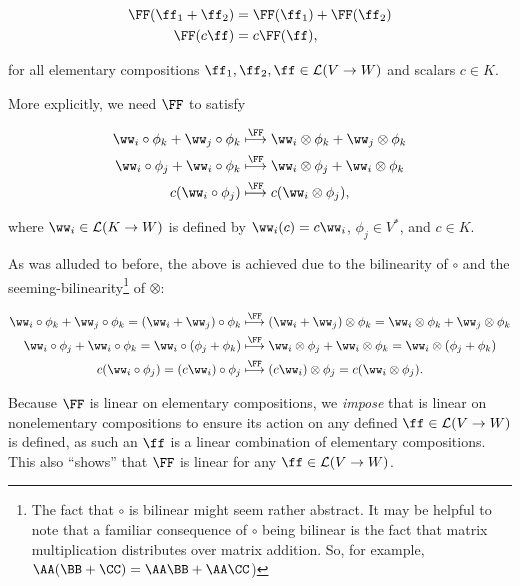 \begin{align*}
    \FF(\ff_1 + \ff_2) &= \FF(\ff_1) + \FF(\ff_2) \\
    \FF(c\ff) &= c\FF(\ff),
\end{align*}

for all elementary compositions $\ff_1, \ff_2, \ff \in \LLLL(V \rightarrow W)$ and scalars $c \in K$.

More explicitly, we need $\FF$ to satisfy

\begin{align*}
    \ww_i \circ \phi_k + \ww_j \circ \phi_k 
    &\overset{\FF}{\longmapsto}
    \ww_i \otimes \phi_k + \ww_j \otimes \phi_k
    \\
    \ww_i \circ \phi_j + \ww_i \circ \phi_k 
    &\overset{\FF}{\longmapsto}
    \ww_i \otimes \phi_j + \ww_i \otimes \phi_k
    \\
    c (\ww_i \circ \phi_j)
    &\overset{\FF}{\longmapsto}
    c (\ww_i \otimes \phi_j),
\end{align*}

where $\ww_i \in \LLLL(K \rightarrow W)$ is defined by $\ww_i(c) = c \ww_i$, $\phi_j \in V^*$, and $c \in K$.

As was alluded to before, the above is achieved due to the bilinearity of $\circ$ and the seeming-bilinearity\footnote{The fact that $\circ$ is bilinear might seem rather abstract. It may be helpful to note that a familiar consequence of $\circ$ being bilinear is the fact that matrix multiplication distributes over matrix addition. So, for example, $\AA(\BB + \CC) = \AA \BB + \AA \CC$)} of $\otimes$:

\begin{align*}
    \ww_i \circ \phi_k + \ww_j \circ \phi_k 
    = (\ww_i + \ww_j) \circ \phi_k
    &\overset{\FF}{\longmapsto}
    (\ww_i + \ww_j) \otimes \phi_k = \ww_i \otimes \phi_k + \ww_j \otimes \phi_k
    \\
    \ww_i \circ \phi_j + \ww_i \circ \phi_k 
    = \ww_i \circ (\phi_j + \phi_k)
    &\overset{\FF}{\longmapsto}
    \ww_i \otimes \phi_j + \ww_i \otimes \phi_k
    = \ww_i \otimes (\phi_j + \phi_k)
    \\
    c (\ww_i \circ \phi_j)
    = (c \ww_i) \circ \phi_j
    &\overset{\FF}{\longmapsto}
    (c \ww_i) \otimes \phi_j
    = c (\ww_i \otimes \phi_j).
\end{align*}

Because $\FF$ is linear on elementary compositions, we \textit{impose} that is linear on nonelementary compositions to ensure its action on any defined $\ff \in \LLLL(V \rightarrow W)$ is defined, as such an $\ff$ is a linear combination of elementary compositions. This also ``shows'' that $\FF$ is linear for any $\ff \in \LLLL(V \rightarrow W)$.

